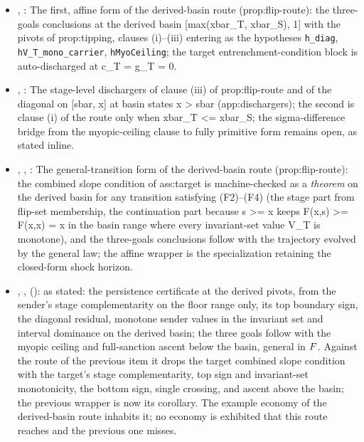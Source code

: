 \begin{itemize}[leftmargin=1.4em,itemsep=1pt]
\item {}, : The first, affine form of the derived-basin route (prop:flip-route): the three-goals conclusions at the derived basin [max(xbar\_T, xbar\_S), 1] with the pivots of prop:tipping, clauses (i)--(iii) entering as the hypotheses \texttt{h\_diag}, \texttt{hV\_T\_mono\_carrier}, \texttt{hMyoCeiling}; the target entrenchment-condition block is auto-discharged at c\_T = g\_T = 0.
\item {}, : The stage-level dischargers of clause (iii) of prop:flip-route and of the diagonal on [sbar, x] at basin states x \textgreater{} sbar (app:dischargers); the second is clause (i) of the route only when xbar\_T \textless{}= xbar\_S; the sigma-difference bridge from the myopic-ceiling clause to fully primitive form remains open, as stated inline.
\item {}, , : The general-transition form of the derived-basin route (prop:flip-route): the combined slope condition of ass:target is machine-checked as a \emph{theorem} on the derived basin for any transition satisfying (F2)--(F4) (the stage part from flip-set membership, the continuation part because s \textgreater{}= x keeps F(x,s) \textgreater{}= F(x,x) = x in the basin range where every invariant-set value V\_T is monotone), and the three-goals conclusions follow with the trajectory evolved by the general law; the affine wrapper is the specialization retaining the closed-form shock horizon.
\item {}, ,  ():  as stated: the persistence certificate at the derived pivots, from the sender's stage complementarity on the floor range only, its top boundary sign, the diagonal residual, monotone sender values in the invariant set and interval dominance on the derived basin; the three goals follow with the myopic ceiling and full-sanction ascent below the basin, general in $F$. Against the route of the previous item it drops the target combined slope condition with the target's stage complementarity, top sign and invariant-set monotonicity, the bottom sign, single crossing, and ascent above the basin; the previous wrapper is now its corollary. The example economy of the derived-basin route inhabits it; no economy is exhibited that this route reaches and the previous one misses.

\end{itemize}

